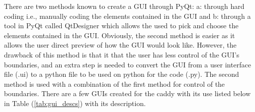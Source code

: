\documentclass[11pt,landscape]{article}
\begin{document}
\begin{multicols}{3}
There are two methods known to create a GUI through PyQt: a: through hard coding
i.e., manually coding the elements contained in the GUI and b: through a tool in
PyQt called QtDesigner which allows the used to pick and choose the elements
contained in the GUI. Obviously, the second method is easier as it allows the
user direct preview of how the GUI would look like. However, the drawback of
this method is that it that the user has less control of the GUI’s boundaries,
and an extra step is needed to convert the GUI from a user interface file (.ui)
to a python file to be used on python for the code (.py). The second method is
used with a combination of the first method for control of the boundaries. There
are a few GUIs created for the caddy with its use listed below in Table
(\ref{tab:gui_descs}) with its description.

\begin{table}[H]
    \begin{center}
    \end{center}
    \label{tab:gui_descs}
\end{table}


\end{multicols}
\end{document}
